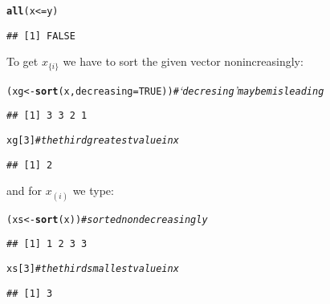 \documentclass[11pt]{article}\usepackage[]{graphicx}\usepackage[]{color}
\makeatletter
\newcommand{\hlnum}[1]{\textcolor[rgb]{0.686,0.059,0.569}{#1}}%
\newcommand{\hlcom}[1]{\textcolor[rgb]{0.678,0.584,0.686}{\textit{#1}}}%
\newcommand{\hlopt}[1]{\textcolor[rgb]{0,0,0}{#1}}%
\newcommand{\hlstd}[1]{\textcolor[rgb]{0.345,0.345,0.345}{#1}}%
\newcommand{\hlkwb}[1]{\textcolor[rgb]{0.69,0.353,0.396}{#1}}%
\newcommand{\hlkwc}[1]{\textcolor[rgb]{0.333,0.667,0.333}{#1}}%
\newcommand{\hlkwd}[1]{\textcolor[rgb]{0.737,0.353,0.396}{\textbf{#1}}}%
\newenvironment{kframe}{%
 \def\at@end@of@kframe{}%
 \ifinner\ifhmode%
  \def\at@end@of@kframe{\end{minipage}}%
  \begin{minipage}{\columnwidth}%
 \fi\fi%
 \def\FrameCommand##1{\hskip\@totalleftmargin \hskip-\fboxsep
 \colorbox{shadecolor}{##1}\hskip-\fboxsep
     \hskip-\linewidth \hskip-\@totalleftmargin \hskip\columnwidth}%
 \MakeFramed {\advance\hsize-\width
   \@totalleftmargin\z@ \linewidth\hsize
   \@setminipage}}%
 {\par\unskip\endMakeFramed%
 \at@end@of@kframe}
\newenvironment{knitrout}{}{} %
\theoremstyle{remark}
\theoremstyle{definition}
\makeatother
\begin{document}
\begin{knitrout}\small
{}\color{fgcolor}\begin{kframe}
\begin{alltt}
\hlkwd{all}\hlstd{(x} \hlopt{<=} \hlstd{y)}
\end{alltt}
\begin{verbatim}
## [1] FALSE
\end{verbatim}
\end{kframe}
\end{knitrout}

To get $x_{\{i\}}$ we have to sort the given vector nonincreasingly:

\begin{knitrout}\small
{}\color{fgcolor}\begin{kframe}
\begin{alltt}
\hlstd{(xg} \hlkwb{<-} \hlkwd{sort}\hlstd{(x,} \hlkwc{decreasing}\hlstd{=}\hlnum{TRUE}\hlstd{))} \hlcom{# `decresing' may be misleading}
\end{alltt}
\begin{verbatim}
## [1] 3 3 2 1
\end{verbatim}
\begin{alltt}
\hlstd{xg[}\hlnum{3}\hlstd{]} \hlcom{# the third greatest value in x}
\end{alltt}
\begin{verbatim}
## [1] 2
\end{verbatim}
\end{kframe}
\end{knitrout}

\noindent
and for $x_{(i)}$ we type:

\begin{knitrout}\small
{}\color{fgcolor}\begin{kframe}
\begin{alltt}
\hlstd{(xs} \hlkwb{<-} \hlkwd{sort}\hlstd{(x))} \hlcom{# sorted nondecreasingly}
\end{alltt}
\begin{verbatim}
## [1] 1 2 3 3
\end{verbatim}
\begin{alltt}
\hlstd{xs[}\hlnum{3}\hlstd{]} \hlcom{# the third smallest value in x}
\end{alltt}
\begin{verbatim}
## [1] 3
\end{verbatim}
\end{kframe}
\end{knitrout}
\end{document}
